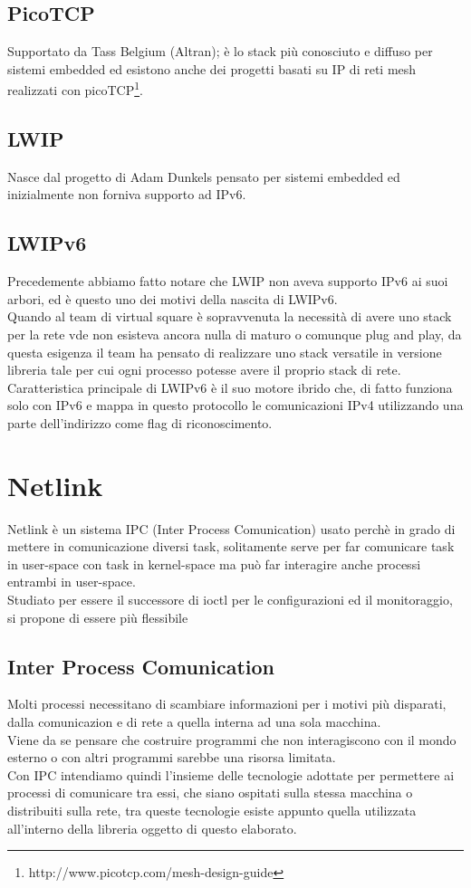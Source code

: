 \subsection{PicoTCP}
Supportato da Tass Belgium (Altran); \`e lo stack pi\`u conosciuto e diffuso per sistemi embedded ed esistono anche dei progetti basati su IP di reti mesh realizzati con picoTCP\footnote{http://www.picotcp.com/mesh-design-guide}.
\subsection{LWIP}
Nasce dal progetto di Adam Dunkels pensato per sistemi embedded ed inizialmente non forniva supporto ad IPv6.
\subsection{LWIPv6}
Precedemente abbiamo fatto notare che LWIP non aveva supporto IPv6 ai suoi arbori, ed è questo uno dei motivi della nascita di LWIPv6.\\
Quando al team di virtual square \`e sopravvenuta la necessit\`a di avere uno stack per la rete vde non esisteva ancora nulla di maturo o comunque plug and play, da questa esigenza il team ha pensato di realizzare uno stack versatile in versione libreria tale per cui ogni processo potesse avere il proprio stack di rete.\\
Caratteristica principale di LWIPv6 \`e il suo motore ibrido che, di fatto funziona solo con IPv6 e mappa in questo protocollo le comunicazioni IPv4 utilizzando una parte dell'indirizzo come flag di riconoscimento.
\section{Netlink}
Netlink \`e un sistema IPC (Inter Process Comunication) usato perch\`e in grado di mettere in comunicazione diversi task, solitamente serve per far comunicare task in user-space con task in kernel-space ma pu\`o far interagire anche processi entrambi in user-space.\\
Studiato per essere il successore di ioctl per le configurazioni ed il monitoraggio, si propone di essere pi\`u flessibile
\subsection{Inter Process Comunication}
Molti processi necessitano di scambiare informazioni per i motivi pi\`u disparati, dalla comunicazion e di rete a quella interna ad una sola macchina.\\
Viene da se pensare che costruire programmi che non interagiscono con il mondo esterno o con altri programmi sarebbe una risorsa limitata.\\
Con IPC intendiamo quindi l'insieme delle tecnologie adottate per permettere ai processi di comunicare tra essi, che siano ospitati sulla stessa macchina o distribuiti sulla rete, tra queste tecnologie esiste appunto quella utilizzata all'interno della libreria oggetto di questo elaborato.
